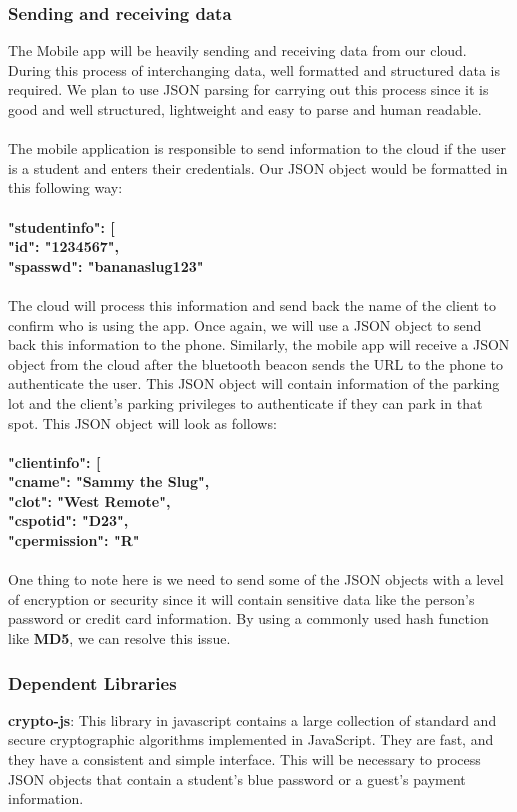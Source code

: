 \documentclass[paper=a4, fontsize=12pt]{scrartcl}
\numberwithin{equation}{section}		%
\numberwithin{figure}{section}			%
\numberwithin{table}{section}				%
\begin{document}
\subsubsection{Sending and receiving data}
The Mobile app will be heavily sending and receiving data from our cloud. During this process of interchanging data, well formatted and structured data is required. We plan to use JSON parsing for carrying out this process since it is good and well structured, lightweight and easy to parse and human readable.
\\\\
The mobile application is responsible to send information to the cloud if the user is a student and enters their credentials. Our JSON object would be formatted in this following way:
\\\\
\textbf{"studentinfo": [
\\
"id": "1234567",
\\
"spasswd": "bananaslug123"
\\\\
}
The cloud will process this information and send back the name of the client to confirm who is using the app. Once again, we will use a JSON object to send back this information to the phone. Similarly, the mobile app will receive a JSON object from the cloud after the bluetooth beacon sends the URL to the phone to authenticate the user. This JSON object will contain information of the parking lot and the client's parking privileges to authenticate if they can park in that spot. This JSON object will look as follows:
\\\\
\textbf{"clientinfo": [
\\
"cname": "Sammy the Slug",
\\
"clot": "West Remote",
\\
"cspotid": "D23",
\\
"cpermission": "R"
\\\\}
One thing to note here is we need to send some of the JSON objects with a level of encryption or security since it will contain sensitive data like the person's password or credit card information. By using a commonly used hash function like \textbf{MD5}, we can resolve this issue.

\subsubsection{Dependent Libraries}
\textbf{crypto-js}: This library in javascript contains a large collection of standard and secure cryptographic algorithms implemented in JavaScript. They are fast, and they have a consistent and simple interface. This will be necessary to process JSON objects that contain a student's blue password or a guest's payment information.
\end{document}
